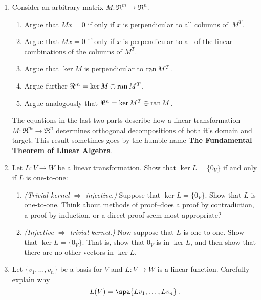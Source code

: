 


\begin{enumerate}

\item 
Consider an arbitrary matrix $M:\Re^m\to \Re^n.$
\begin{enumerate}
\item Argue that $Mx=0$ if only if $x$ is perpendicular to all columns of~$M^T$.
\item Argue that $Mx=0$ if only if $x$ is perpendicular to all of the linear combinations of the columns of $M^T$.
\item Argue that $\ker M$ is perpendicular to ${\rm ran} \,M^T$. 
\item Argue further $\Re^m=\ker M \oplus {\rm ran}\, M^T$. 
\item Argue analogously that $\Re^n=\ker M^T \oplus {\rm ran}\, M$. 
\end{enumerate} 
The equations in the last two parts describe how a linear transformation $M:\Re^m\to \Re^n$ determines orthogonal decompositions of both it's domain and target. This result sometimes goes by the humble name {\bf{The Fundamental Theorem of Linear Algebra}}.




\item \label{injectivekernalprob} Let $L \colon V\rightarrow W$ be a linear transformation.  Show that $\ker L=\{0_V\}$ if and only if $L$ is one-to-one:
\begin{enumerate}
\item {\it (Trivial kernel $\Rightarrow$ injective.)} Suppose that \(\ker L=\{0_V\}\). Show that \(L\) is one-to-one. Think about methods of proof--does a proof by contradiction, a proof by induction, or a direct proof seem most appropriate?
\item {\it (Injective $\Rightarrow$ trivial kernel.)} Now suppose that \(L\) is one-to-one. Show that \(\ker L=\{0_V\}\). That is, show that \(0_V\) is in \(\ker L\), and then show that there are no other vectors in \(\ker L\).
\end{enumerate}

\item Let $\{v_1, \ldots, v_n  \}$ be a basis for $V$ and $L:V\to W$ is a linear function. Carefully explain why
\[
L(V)=\spa \{Lv_1, \ldots, Lv_n \}\, .
\]



\end{enumerate}

